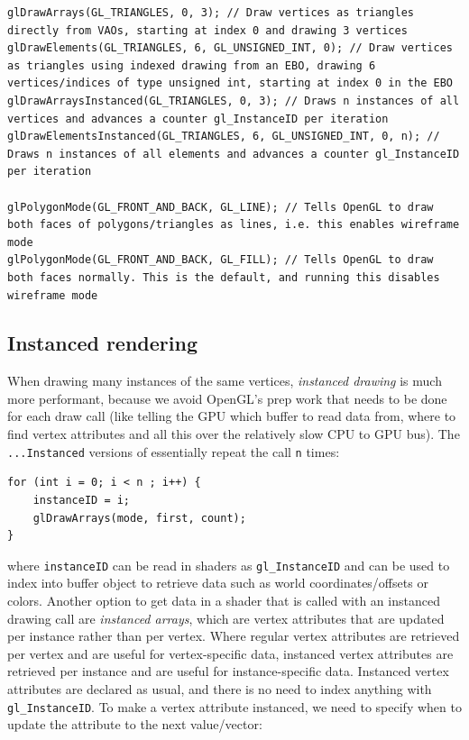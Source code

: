 \documentclass[table, xcdraw]{article}%
\begin{document}
\begin{verbatim}
glDrawArrays(GL_TRIANGLES, 0, 3); // Draw vertices as triangles directly from VAOs, starting at index 0 and drawing 3 vertices
glDrawElements(GL_TRIANGLES, 6, GL_UNSIGNED_INT, 0); // Draw vertices as triangles using indexed drawing from an EBO, drawing 6 vertices/indices of type unsigned int, starting at index 0 in the EBO
glDrawArraysInstanced(GL_TRIANGLES, 0, 3); // Draws n instances of all vertices and advances a counter gl_InstanceID per iteration
glDrawElementsInstanced(GL_TRIANGLES, 6, GL_UNSIGNED_INT, 0, n); // Draws n instances of all elements and advances a counter gl_InstanceID per iteration

glPolygonMode(GL_FRONT_AND_BACK, GL_LINE); // Tells OpenGL to draw both faces of polygons/triangles as lines, i.e. this enables wireframe mode
glPolygonMode(GL_FRONT_AND_BACK, GL_FILL); // Tells OpenGL to draw both faces normally. This is the default, and running this disables wireframe mode
\end{verbatim}

\subsection{Instanced rendering}

When drawing many instances of the same vertices, \emph{instanced drawing} is much more performant, because we avoid OpenGL's prep work that needs to be done for each draw call (like telling the GPU which buffer to read data from, where to find vertex attributes and all this over the relatively slow CPU to GPU bus). The \texttt{...Instanced} versions of essentially repeat the call \texttt{n} times:

\begin{verbatim}
for (int i = 0; i < n ; i++) {
    instanceID = i;
    glDrawArrays(mode, first, count);
}
\end{verbatim}

where \texttt{instanceID} can be read in shaders as \texttt{gl_InstanceID} and can be used to index into buffer object to retrieve data such as world coordinates/offsets or colors. Another option to get data in a shader that is called with an instanced drawing call are \emph{instanced arrays}, which are vertex attributes that are updated per instance rather than per vertex. Where regular vertex attributes are retrieved per vertex and are useful for vertex-specific data, instanced vertex attributes are retrieved per instance and are useful for instance-specific data. Instanced vertex attributes are declared as usual, and there is no need to index anything with \texttt{gl_InstanceID}. To make a vertex attribute instanced, we need to specify when to update the attribute to the next value/vector:
\end{document}
